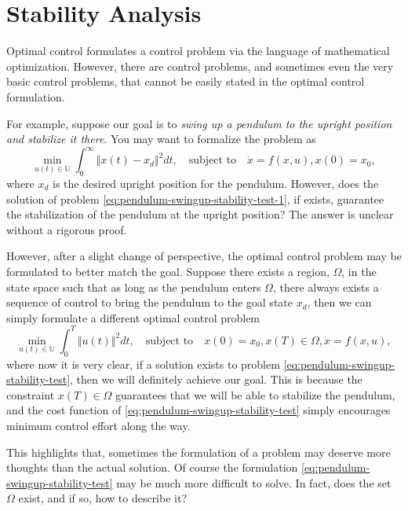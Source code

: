 \documentclass[
]{book}
\theoremstyle{definition}
\theoremstyle{definition}
\theoremstyle{definition}
\theoremstyle{definition}
\theoremstyle{remark}
\begin{document}
\hypertarget{stability}{%
\chapter{Stability Analysis}\label{stability}}

Optimal control formulates a control problem via the language of mathematical optimization. However, there are control problems, and sometimes even the very basic control problems, that cannot be easily stated in the optimal control formulation.

For example, suppose our goal is to \emph{swing up a pendulum to the upright position and stabilize it there}. You may want to formalize the problem as
\begin{equation}
\min_{u(t) \in \mathbb{U}} \int_{0}^{\infty} \Vert x(t) - x_d \Vert^2 dt, \quad \text{subject to} \quad \dot{x} = f(x,u), x(0) = x_0,
\label{eq:pendulum-swingup-stability-test-1}
\end{equation}
where \(x_d\) is the desired upright position for the pendulum. However, does the solution of problem \eqref{eq:pendulum-swingup-stability-test-1}, if exists, guarantee the stabilization of the pendulum at the upright position? The answer is unclear without a rigorous proof.

However, after a slight change of perspective, the optimal control problem may be formulated to better match the goal. Suppose there exists a region, \(\Omega\), in the state space such that as long as the pendulum enters \(\Omega\), there always exists a sequence of control to bring the pendulum to the goal state \(x_d\), then we can simply formulate a different optimal control problem
\begin{equation}
\min_{u(t) \in \mathbb{U}} \int_{0}^{T} \Vert u(t) \Vert^2 dt, \quad \text{subject to} \quad x(0)=x_0, x(T) \in \Omega, \dot{x} = f(x,u),
\label{eq:pendulum-swingup-stability-test}
\end{equation}
where now it is very clear, if a solution exists to problem \eqref{eq:pendulum-swingup-stability-test}, then we will definitely achieve our goal. This is because the constraint \(x(T) \in \Omega\) guarantees that we will be able to stabilize the pendulum, and the cost function of \eqref{eq:pendulum-swingup-stability-test} simply encourages minimum control effort along the way.

This highlights that, sometimes the formulation of a problem may deserve more thoughts than the actual solution. Of course the formulation \eqref{eq:pendulum-swingup-stability-test} may be much more difficult to solve. In fact, does the set \(\Omega\) exist, and if so, how to describe it?
\end{document}
